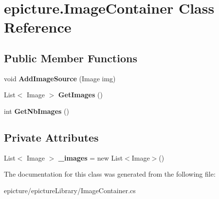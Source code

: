 \hypertarget{classepicture_1_1_image_container}{}\section{epicture.\+Image\+Container Class Reference}
\label{classepicture_1_1_image_container}
\subsection*{Public Member Functions}
\begin{DoxyCompactItemize}
\item 
\mbox{\label{classepicture_1_1_image_container_aeefd3ffbd166c933ce02b55fa21f842b}} 
void {\bfseries Add\+Image\+Source} (Image img)
\item 
\mbox{\label{classepicture_1_1_image_container_ad34fd9cb915da8085bde614fcb3853c4}} 
List$<$ Image $>$ {\bfseries Get\+Images} ()
\item 
\mbox{\label{classepicture_1_1_image_container_aca03c1fe0000f454a1b3da6557b8a65c}} 
int {\bfseries Get\+Nb\+Images} ()
\end{DoxyCompactItemize}
\subsection*{Private Attributes}
\begin{DoxyCompactItemize}
\item 
\mbox{\label{classepicture_1_1_image_container_ad2c3200320969e816372986b007b70ff}} 
List$<$ Image $>$ {\bfseries \+\_\+images} = new List$<$Image$>$()
\end{DoxyCompactItemize}


The documentation for this class was generated from the following file\+:\begin{DoxyCompactItemize}
\item 
epicture/epicture\+Library/Image\+Container.\+cs\end{DoxyCompactItemize}
